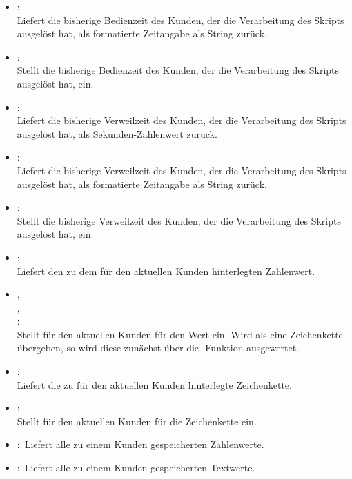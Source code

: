 \begin{itemize}
\item
{}:\\
Liefert die bisherige Bedienzeit des Kunden, der die Verarbeitung des Skripts ausgelöst hat, als formatierte Zeitangabe als String zurück.
  
\item
{}:\\
Stellt die bisherige Bedienzeit des Kunden, der die Verarbeitung des Skripts ausgelöst hat, ein.

\item
{}:\\
Liefert die bisherige Verweilzeit des Kunden, der die Verarbeitung des Skripts ausgelöst hat, als Sekunden-Zahlenwert zurück.

\item
{}:\\
Liefert die bisherige Verweilzeit des Kunden, der die Verarbeitung des Skripts ausgelöst hat, als formatierte Zeitangabe als String zurück.

\item
{}:\\
Stellt die bisherige Verweilzeit des Kunden, der die Verarbeitung des Skripts ausgelöst hat, ein.

\item
{}:\\
Liefert den zu dem  für den aktuellen Kunden hinterlegten Zahlenwert.
  
\item
{},\\
,\\
:\\
Stellt für den aktuellen Kunden für  den Wert  ein.
Wird als  eine Zeichenkette übergeben, so wird diese zunächst über die
-Funktion ausgewertet.
  
\item
{}:\\
Liefert die zu  für den aktuellen Kunden hinterlegte Zeichenkette.
  
\item
{}:\\
Stellt für den aktuellen Kunden für  die Zeichenkette  ein.

\item
{}:\
Liefert alle zu einem Kunden gespeicherten Zahlenwerte.
  
\item
{}:\
Liefert alle zu einem Kunden gespeicherten Textwerte.
	
\end{itemize}

